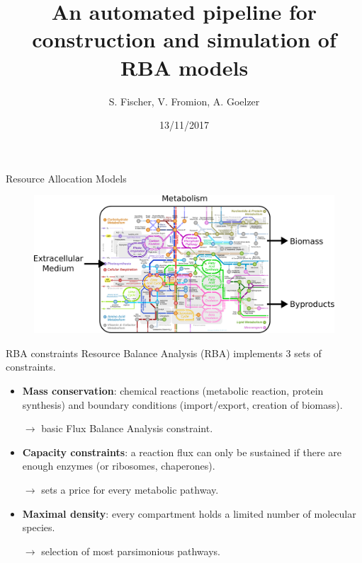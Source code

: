 \documentclass{beamer}
\begin{document}
\title{An automated pipeline for construction and simulation of RBA models}
\author{S. Fischer, V. Fromion, A. Goelzer}
\date{13/11/2017}
\maketitle

\begin{frame}{Resource Allocation Models}
  \begin{figure}
    \centering
    \includegraphics[width=\linewidth]{intro}
  \end{figure}
\end{frame}

\begin{frame}{RBA constraints}
  Resource Balance Analysis (RBA) implements 3 sets of constraints.
  \begin{itemize}
    \item \textbf{Mass conservation}: chemical reactions
    (metabolic reaction, protein synthesis)
    and boundary conditions (import/export, creation of biomass).

    $\rightarrow$ basic Flux Balance Analysis constraint.

    \item \textbf{Capacity constraints}: a reaction flux can only be sustained
    if there are enough enzymes (or ribosomes, chaperones).

    $\rightarrow$ sets a price for every metabolic pathway.

    \item \textbf{Maximal density}: every compartment holds a limited number
    of molecular species.

    $\rightarrow$ selection of most parsimonious pathways.
  \end{itemize}
\end{frame}
\end{document}
